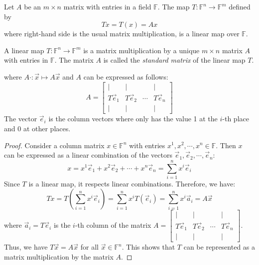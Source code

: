 \documentclass[
	11pt, %
	fleqn, %
	a4paper, %
]{LegrandOrangeBook}
\newcommand{\Hom}{\mathsf{Hom}} %
\newcommand{\F}{\mathbb{F}} %
\newcommand{\M}[2]{\mathsf{M}_{#1}(#2)} %
\begin{document}
\begin{example}
    Let $A$ be an $m \times n$ matrix with entries in a field $\F$. The map $T: \F^n \to \F^m$ defined by
    \[
        Tx = T(x) = Ax
    \]
    where right-hand side is the usual matrix multiplication, is a linear map over $\F$.
\end{example}

\begin{proposition}
    A linear map $T: \F^n \to \F^m$ is a matrix multiplication by a unique $m \times n$ matrix $A$ with entries in $\F$. The matrix $A$ is called the \emph{standard matrix} of the linear map $T$.
    
    \begin{center}
    \end{center}
    where $A\cdot : \vec{x} \mapsto A\vec{x}$ and $A$ can be expressed as follows:
    \[
        A = \begin{bmatrix}
            | & | & & | \\
            T\vec{e}_1 & T\vec{e}_2 & \cdots & T\vec{e}_n \\
            | & | & & |
        \end{bmatrix}
    \]
    The vector $\vec{e}_i$ is the column vectors where only has the value 1 at the $i$-th place and 0 at other places.
\end{proposition}

\begin{proof}
    Consider a column matrix $x \in \F^n$ with entries $x^1, x^2, \cdots, x^n \in \F$. Then $x$ can be expressed as a linear combination of the vectors $\vec{e}_1, \vec{e}_2, \cdots, \vec{e}_n$:
    \[
        x = x^1 \vec{e}_1 + x^2 \vec{e}_2 + \cdots + x^n \vec{e}_n = \sum_{i=1}^{n} x^i \vec{e}_i
    \]
    Since $T$ is a linear map, it respects linear combinations. Therefore, we have:
    \[
        Tx = T\left( \sum_{i=1}^{n} x^i \vec{e}_i \right) = \sum_{i=1}^{n} x^i T(\vec{e}_i) = \sum_{i=1}^{n} x^i \vec{a}_i = A\vec{x}
    \]
    where $\vec{a}_i = T\vec{e}_i$ is the $i$-th column of the matrix $A = \begin{bmatrix}
        | & | & & | \\
        T\vec{e}_1 & T\vec{e}_2 & \cdots & T\vec{e}_n \\
        | & | & & |
    \end{bmatrix}$. Thus, we have $T\vec{x} = A\vec{x}$ for all $\vec{x} \in \F^n$. This shows that $T$ can be represented as a matrix multiplication by the matrix $A$.
\end{proof}
\end{document}
